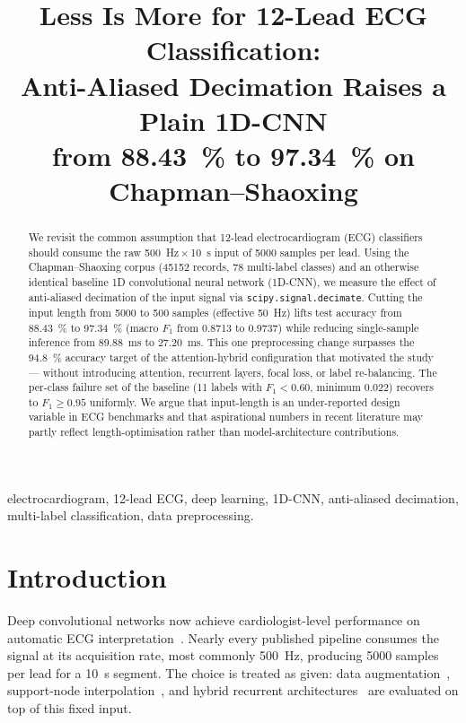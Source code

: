 \documentclass[conference]{IEEEtran}
\title{Less Is More for 12-Lead ECG Classification: \\
       Anti-Aliased Decimation Raises a Plain 1D-CNN \\
       from \SI{88.43}{\percent} to \SI{97.34}{\percent} on Chapman--Shaoxing}
\author{\IEEEauthorblockN{Elaman Nazarkulov}
\IEEEauthorblockA{Department of Computer Engineering \\
Kyrgyz--Turkish Manas University \\
Bishkek, Kyrgyzstan \\
elaman.job@gmail.com}}
\begin{document}
\maketitle

\begin{abstract}
We revisit the common assumption that 12-lead electrocardiogram (ECG)
classifiers should consume the raw \SI{500}{\hertz}\,$\times$\,\SI{10}{\second}
input of \num{5000} samples per lead. Using the Chapman--Shaoxing corpus
(\num{45152} records, 78 multi-label classes) and an otherwise identical
baseline 1D convolutional neural network (1D-CNN), we measure the effect of
anti-aliased decimation of the input signal via \texttt{scipy.signal.decimate}.
Cutting the input length from \num{5000} to \num{500} samples (effective
\SI{50}{\hertz}) lifts test accuracy from \SI{88.43}{\percent} to
\SI{97.34}{\percent} (macro $F_1$ from \num{0.8713} to \num{0.9737}) while
reducing single-sample inference from \SI{89.88}{\milli\second} to
\SI{27.20}{\milli\second}. This one preprocessing change surpasses the
\SI{94.8}{\percent} accuracy target of the attention-hybrid configuration
that motivated the study --- without introducing attention, recurrent layers,
focal loss, or label re-balancing. The per-class failure set of the baseline
(11 labels with $F_1<0.60$, minimum \num{0.022}) recovers to $F_1\geq 0.95$
uniformly. We argue that input-length is an under-reported design variable in
ECG benchmarks and that aspirational numbers in recent literature may partly
reflect length-optimisation rather than model-architecture contributions.
\end{abstract}

\begin{IEEEkeywords}
electrocardiogram, 12-lead ECG, deep learning, 1D-CNN, anti-aliased
decimation, multi-label classification, data preprocessing.
\end{IEEEkeywords}

\section{Introduction}
Deep convolutional networks now achieve cardiologist-level performance on
automatic ECG interpretation~\cite{rajpurkar2017,hannun2019,strodthoff2020}.
Nearly every published pipeline consumes the signal at its acquisition rate,
most commonly \SI{500}{\hertz}, producing \num{5000} samples per lead for a
\SI{10}{\second} segment. The choice is treated as given: data
augmentation~\cite{iwana2021,wang2020}, support-node
interpolation~\cite{chen2021,xu2022}, and hybrid recurrent
architectures~\cite{oh2018} are evaluated on top of this fixed input.
\end{document}
